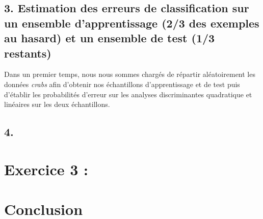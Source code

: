 \documentclass[a4paper, 10pt]{article}
\begin{document}
\subsection*{3. Estimation des erreurs de classification sur un ensemble d'apprentissage (2/3 des exemples au hasard)
et un ensemble de test (1/3 restants)}
Dans un premier temps, nous nous sommes chargés de répartir aléatoirement les données \textit{crabs} afin d'obtenir nos échantillons
d'apprentissage et de test puis d'établir les probabilités d'erreur sur les analyses discriminantes quadratique et linéaires
sur les deux échantillons.

\subsection*{4. }

\section*{Exercice 3 : }

\subsection*{}
\subsection*{}
\subsection*{}

\section*{Conclusion}
\end{document}
